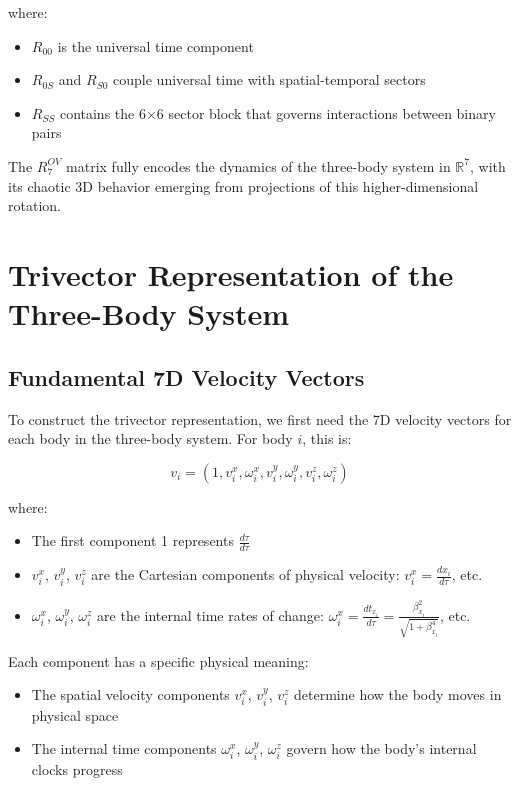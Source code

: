 \documentclass{article}
\begin{document}
where:
\begin{itemize}
\item $R_{00}$ is the universal time component
\item $R_{0S}$ and $R_{S0}$ couple universal time with spatial-temporal sectors
\item $R_{SS}$ contains the 6×6 sector block that governs interactions between binary pairs
\end{itemize}

The $R^{OV}_7$ matrix fully encodes the dynamics of the three-body system in $\mathbb{R}^7$, with its chaotic 3D behavior emerging from projections of this higher-dimensional rotation.

\section{Trivector Representation of the Three-Body System}

\subsection{Fundamental 7D Velocity Vectors}

To construct the trivector representation, we first need the 7D velocity vectors for each body in the three-body system. For body $i$, this is:

\begin{equation}
v_i = \left(1, v_i^x, \omega_i^x, v_i^y, \omega_i^y, v_i^z, \omega_i^z\right)
\end{equation}

where:
\begin{itemize}
\item The first component 1 represents $\frac{d\tau}{d\tau}$
\item $v_i^x$, $v_i^y$, $v_i^z$ are the Cartesian components of physical velocity: $v_i^x = \frac{dx_i}{d\tau}$, etc.
\item $\omega_i^x$, $\omega_i^y$, $\omega_i^z$ are the internal time rates of change: $\omega_i^x = \frac{dt_{x_i}}{d\tau} = \frac{\beta_{x_i}^2}{\sqrt{1+\beta_{x_i}^4}}$, etc.
\end{itemize}

Each component has a specific physical meaning:
\begin{itemize}
\item The spatial velocity components $v_i^x$, $v_i^y$, $v_i^z$ determine how the body moves in physical space
\item The internal time components $\omega_i^x$, $\omega_i^y$, $\omega_i^z$ govern how the body's internal clocks progress
\end{itemize}
\end{document}
